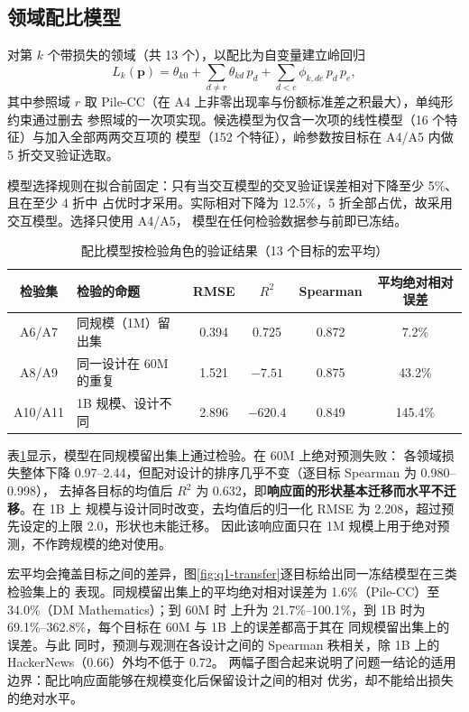 \subsection{领域配比模型}

对第 $k$ 个带损失的领域（共 13 个），以配比为自变量建立岭回归\cite{hoerl1970ridge}
\begin{equation}
  L_k(\boldsymbol{p})=\theta_{k0}+\sum_{d\ne r}\theta_{kd}\,p_d
  +\sum_{d<e}\phi_{k,de}\,p_d\,p_e ,
  \label{eq:mixture}
\end{equation}
其中参照域 $r$ 取 Pile-CC（在 A4 上非零出现率与份额标准差之积最大），单纯形约束通过删去
参照域的一次项实现。候选模型为仅含一次项的线性模型（16 个特征）与加入全部两两交互项的
模型（152 个特征），岭参数按目标在 A4/A5 内做 5 折交叉验证选取。

模型选择规则在拟合前固定：只有当交互模型的交叉验证误差相对下降至少 5\%、且在至少 4 折中
占优时才采用。实际相对下降为 12.5\%，5 折全部占优，故采用交互模型。选择只使用 A4/A5，
模型在任何检验数据参与前即已冻结。

\begin{table}[htbp]
  \centering
  \caption{配比模型按检验角色的验证结果（13 个目标的宏平均）}
  \label{tab:q1-validation}
  \begin{tabular}{clcccc}
    \toprule
    检验集 & 检验的命题 & RMSE & $R^2$ & Spearman & 平均绝对相对误差 \\
    \midrule
    A6/A7 & 同规模（1M）留出集 & 0.394 & 0.725 & 0.872 & 7.2\% \\
    A8/A9 & 同一设计在 60M 的重复 & 1.521 & $-7.51$ & 0.875 & 43.2\% \\
    A10/A11 & 1B 规模、设计不同 & 2.896 & $-620.4$ & 0.849 & 145.4\% \\
    \bottomrule
  \end{tabular}
\end{table}

表\ref{tab:q1-validation}显示，模型在同规模留出集上通过检验。在 60M 上绝对预测失败：
各领域损失整体下降 0.97--2.44，但配对设计的排序几乎不变（逐目标 Spearman 为 0.980--0.998），
去掉各目标的均值后 $R^2$ 为 0.632，即\textbf{响应面的形状基本迁移而水平不迁移}。在 1B 上
规模与设计同时改变，去均值后的归一化 RMSE 为 2.208，超过预先设定的上限 2.0，形状也未能迁移。
因此该响应面只在 1M 规模上用于绝对预测，不作跨规模的绝对使用。

宏平均会掩盖目标之间的差异，图\ref{fig:q1-transfer}逐目标给出同一冻结模型在三类检验集上的
表现。同规模留出集上的平均绝对相对误差为 1.6\%（Pile-CC）至 34.0\%（DM Mathematics）；到 60M 时
上升为 21.7\%--100.1\%，到 1B 时为 69.1\%--362.8\%，每个目标在 60M 与 1B 上的误差都高于其在
同规模留出集上的误差。与此
同时，预测与观测在各设计之间的 Spearman 秩相关，除 1B 上的 HackerNews（0.66）外均不低于 0.72。
两幅子图合起来说明了问题一结论的适用边界：配比响应面能够在规模变化后保留设计之间的相对
优劣，却不能给出损失的绝对水平。

